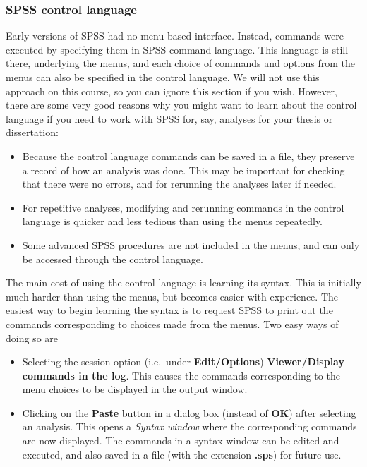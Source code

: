 \documentclass[11pt,a4paper,openany]{book}
\begin{document}
\subsubsection*{SPSS control language}\label{spss-control-language}

Early versions of SPSS had no menu-based interface. Instead, commands
were executed by specifying them in SPSS command language. This language
is still there, underlying the menus, and each choice of commands and
options from the menus can also be specified in the control language. We
will not use this approach on this course, so you can ignore this
section if you wish. However, there are some very good reasons why you
might want to learn about the control language if you need to work with
SPSS for, say, analyses for your thesis or dissertation:

\begin{itemize}
\item
  Because the control language commands can be saved in a file, they
  preserve a record of how an analysis was done. This may be important
  for checking that there were no errors, and for rerunning the analyses
  later if needed.
\item
  For repetitive analyses, modifying and rerunning commands in the
  control language is quicker and less tedious than using the menus
  repeatedly.
\item
  Some advanced SPSS procedures are not included in the menus, and can
  only be accessed through the control language.
\end{itemize}

The main cost of using the control language is learning its syntax. This
is initially much harder than using the menus, but becomes easier with
experience. The easiest way to begin learning the syntax is to request
SPSS to print out the commands corresponding to choices made from the
menus. Two easy ways of doing so are

\begin{itemize}
\item
  Selecting the session option (i.e.~under \textbf{Edit/Options})
  \textbf{Viewer/Display commands in the log}. This causes the commands
  corresponding to the menu choices to be displayed in the output
  window.
\item
  Clicking on the \textbf{Paste} button in a dialog box (instead of
  \textbf{OK}) after selecting an analysis. This opens a \emph{Syntax
  window} where the corresponding commands are now displayed. The
  commands in a syntax window can be edited and executed, and also saved
  in a file (with the extension \textbf{.sps}) for future use.
\end{itemize}
\end{document}
